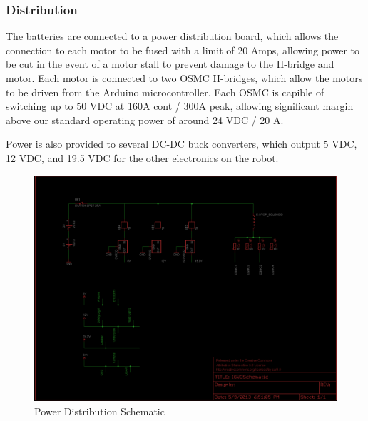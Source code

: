 \subsubsection{Distribution}
The batteries are connected to a power distribution board, which allows the connection to each
motor to be fused with a limit of 20 Amps, allowing power to be cut in the event of a motor stall 
to prevent damage to the H-bridge and motor. Each motor is connected to two OSMC H-bridges, which allow the motors to be driven from the Arduino microcontroller. Each OSMC is capible of switching up to 50 VDC at 160A cont / 300A peak, allowing significant margin above our standard operating power of around 24 VDC / 20 A. 

Power is also provided to several DC-DC buck converters, which output 5 VDC, 12 VDC, and 19.5 VDC for the other electronics on the robot.

\begin{figure}[H]
\begin{center}
\includegraphics[width=6in]{./Pics/PowerSchematic.png}
\caption{Power Distribution Schematic}
\label{FIG:Distribution}
\end{center}
\end{figure}
